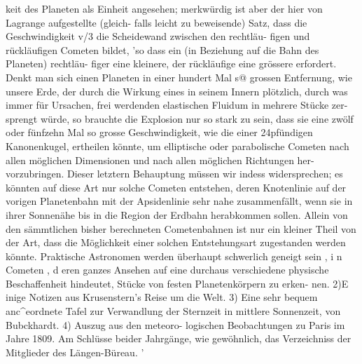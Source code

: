 \documentclass[12pt,a4paper]{article}
\begin{document}
keit des Planeten als Einheit angesehen; merkwürdig ist aber der hier von Lagrange aufgestellte (gleich-\newline
falls leicht zu beweisende) Satz, dass die Geschwindigkeit v/3 die Scheidewand zwischen den rechtläu-\newline
figen und rückläufigen Cometen bildet, 'so dass ein (in Beziehung auf die Bahn des Planeten) rechtläu-\newline
figer eine kleinere, der rückläufige eine grössere erfordert. Denkt man sich einen Planeten in einer\newline
hundert Mal s@ grossen Entfernung, wie unsere Erde, der durch die Wirkung eines in seinem Innern\newline
plötzlich, durch was immer für Ursachen, frei werdenden elastischen Fluidum in mehrere Stücke zer-\newline
sprengt würde, so brauchte die Explosion nur so stark zu sein, dass sie eine zwölf oder fünfzehn Mal\newline
so grosse Geschwindigkeit, wie die einer 24pfündigen Kanonenkugel, ertheilen könnte, um elliptische\newline
oder parabolische Cometen nach allen möglichen Dimensionen und nach allen möglichen Richtungen her-\newline
vorzubringen. Dieser letztern Behauptung müssen wir indess widersprechen; es könnten auf diese Art\newline
nur solche Cometen entstehen, deren Knotenlinie auf der vorigen Planetenbahn mit der Apsidenlinie\newline
sehr nahe zusammenfällt, wenn sie in ihrer Sonnenähe bis in die Region der Erdbahn herabkommen\newline
sollen. Allein von den sämmtlichen bisher berechneten Cometenbahnen ist nur ein kleiner Theil von\newline
der Art, dass die Möglichkeit einer solchen Entstehungsart zugestanden werden könnte. Praktische\newline
Astronomen werden überhaupt schwerlich geneigt sein , i n Cometen , d eren ganzes Ansehen auf eine\newline
durchaus verschiedene physische Beschaffenheit hindeutet, Stücke von festen Planetenkörpern zu erken-\newline
nen. 2)E inige Notizen aus Krusenstern's Reise um die Welt. 3) Eine sehr bequem anc\^{}eordnete Tafel\newline
zur Verwandlung der Sternzeit in mittlere Sonnenzeit, von Bubckhardt. 4) Auszug aus den meteoro-\newline
logischen Beobachtungen zu Paris im Jahre 1809. Am Schlüsse beider Jahrgänge, wie gewöhnlich, das\newline
Verzeichniss der Mitglieder des Längen-Büreau. '\newline
\end{document}

